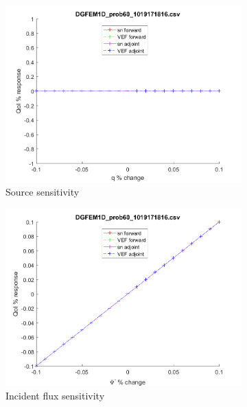 \documentclass{article}
\begin{document}
\begin{figure}[H]
\label{Case60Sens}
\centering
\begin{subfigure}{.5\textwidth}
  \centering
  \includegraphics[width=.98\linewidth]{IanProposal/figures2/60qSens.png}
  \caption{Source sensitivity}
  \label{fig:sfig1}
\end{subfigure}%
\begin{subfigure}{.5\textwidth}
  \centering
  \includegraphics[width=.98\linewidth]{IanProposal/figures2/60incSens.png}
  \caption{Incident flux sensitivity}
  \label{fig:sfig4}
\end{subfigure}%
\\
\begin{subfigure}{.5\textwidth}
  \centering

\end{subfigure}
\end{figure}
\end{document}
